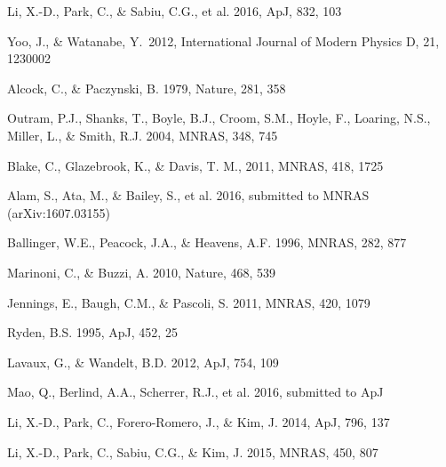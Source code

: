 \documentclass[prl,twocolumn,superscriptaddress,aps,amsmath,amssymb,nofootinbib,altaffilletter]{revtex4}
\begin{document}



\begin{thebibliography}{}
Li, X.-D., Park, C., \& Sabiu, C.G., et al. 2016, ApJ, 832, 103

Yoo, J., \& Watanabe, Y.\ 2012, International Journal of Modern Physics D, 21, 1230002 

Alcock, C., \& Paczynski, B. 1979, Nature, 281, 358  

Outram, P.J., Shanks, T., Boyle, B.J., Croom, S.M., Hoyle, F., Loaring, N.S., 
Miller, L., \& Smith, R.J. 2004, MNRAS, 348, 745  

Blake, C., Glazebrook, K., \& Davis, T. M., 2011, MNRAS, 418, 1725  

Alam, S., Ata, M., \& Bailey, S., et al. 2016,
submitted to MNRAS (arXiv:1607.03155)

Ballinger, W.E., Peacock, J.A., \& Heavens, A.F. 1996, MNRAS, 282, 877  

Marinoni, C., \& Buzzi, A. 2010, Nature, 468, 539  

Jennings, E., Baugh, C.M., \& Pascoli, S. 2011, MNRAS, 420, 1079  

Ryden, B.S. 1995, ApJ, 452, 25  

Lavaux, G., \& Wandelt, B.D. 2012, ApJ, 754, 109  

Mao, Q., Berlind, A.A., Scherrer, R.J., et al. 2016, submitted to ApJ


Li, X.-D., Park, C., Forero-Romero, J., \& Kim, J. 2014, ApJ, 796, 137

Li, X.-D., Park, C., Sabiu, C.G., \& Kim, J. 2015, MNRAS, 450, 807 


\end{thebibliography}
\end{document}

